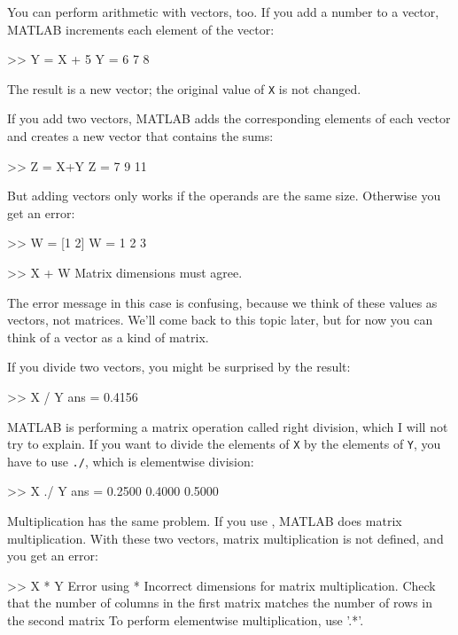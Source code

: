 You can perform arithmetic with vectors, too.  If you add a number
to a vector, MATLAB increments each element of the vector:

\begin{code}
>> Y = X + 5
Y = 6     7     8
\end{code}

The result is a new vector; the original value of {\tt X} is not
changed.

If you add two vectors, MATLAB adds the corresponding elements of each
vector and creates a new vector that contains the sums:

\begin{code}
>> Z = X+Y
Z = 7     9    11
\end{code}

But adding vectors only works if the operands are the same size.
Otherwise you get an error:

\begin{code}
>> W = [1 2]
W = 1     2     3

>> X + W
Matrix dimensions must agree.
\end{code}

The error message in this case is confusing, because we think of these values as vectors, not matrices.
We'll come back to this topic later, but for now you can think of a vector as a kind of matrix.


If you divide two vectors, you might be surprised by the result:

\begin{code}
>> X / Y
ans = 0.4156
\end{code}

MATLAB is performing a matrix operation called right division, which I will not try to explain. If you want to divide the elements of {\tt X} by the elements of {\tt Y}, you have to use {\tt ./}, which is elementwise division:

\begin{code}
>> X ./ Y
ans = 0.2500    0.4000    0.5000
\end{code}

Multiplication has the same problem.  If you use {\tt *}, MATLAB does matrix multiplication.  With these two vectors, matrix multiplication is not defined, and you get an error:

\begin{code}
>> X * Y
Error using  * 
Incorrect dimensions for matrix multiplication. 
Check that the number of columns in the first matrix 
matches the number of rows in the second matrix
To perform elementwise multiplication, use '.*'.
\end{code}

